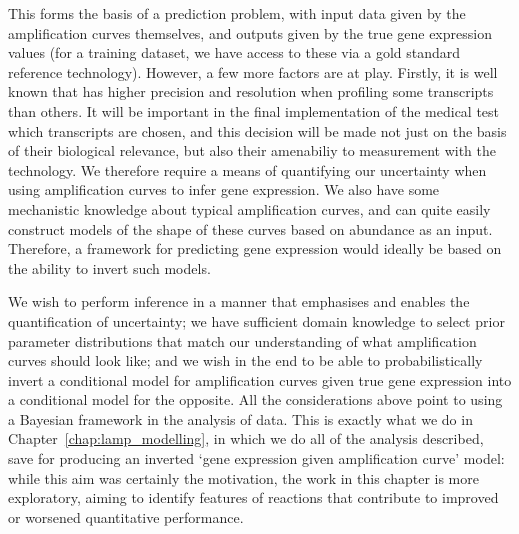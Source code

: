 \documentclass[thesis.tex]{subfiles}
\begin{document}
This forms the basis of a prediction problem, with input data given by the amplification curves themselves, and outputs given by the true gene expression values (for a training dataset, we have access to these via a gold standard reference technology). However, a few more factors are at play. Firstly, it is well known that  has higher precision and resolution when profiling some transcripts than others. It will be important in the final implementation of the medical test which transcripts are chosen, and this decision will be made not just on the basis of their biological relevance, but also their amenabiliy to measurement with the  technology. We therefore require a means of quantifying our uncertainty when using amplification curves to infer gene expression. We also have some mechanistic knowledge about typical amplification curves, and can quite easily construct models of the shape of these curves based on  abundance as an input. Therefore, a framework for predicting gene expression would ideally be based on the ability to invert such models. 

We wish to perform inference in a manner that emphasises and enables the quantification of uncertainty; we have sufficient domain knowledge to select prior parameter distributions that match our understanding of what amplification curves should look like; and we wish in the end to be able to probabilistically invert a conditional model for amplification curves given true gene expression into a conditional model for the opposite. All the considerations above point to using a Bayesian framework in the analysis of  data. This is exactly what we do in Chapter~\ref{chap:lamp_modelling}, in which we do all of the analysis described, save for producing an inverted `gene expression given amplification curve' model: while this aim was certainly the motivation, the work in this chapter is more exploratory, aiming to identify features of  reactions that contribute to improved or worsened quantitative performance.
\end{document}
